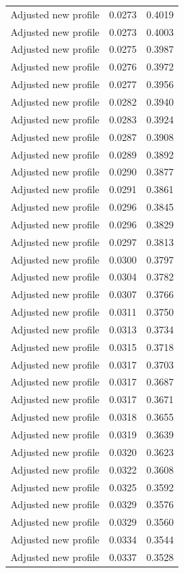 \begin{table}[htbp]
\begin{tabular}{lll}
Adjusted new profile & 0.0273 & 0.4019 \\
Adjusted new profile & 0.0273 & 0.4003 \\
Adjusted new profile & 0.0275 & 0.3987 \\
Adjusted new profile & 0.0276 & 0.3972 \\
Adjusted new profile & 0.0277 & 0.3956 \\
Adjusted new profile & 0.0282 & 0.3940 \\
Adjusted new profile & 0.0283 & 0.3924 \\
Adjusted new profile & 0.0287 & 0.3908 \\
Adjusted new profile & 0.0289 & 0.3892 \\
Adjusted new profile & 0.0290 & 0.3877 \\
Adjusted new profile & 0.0291 & 0.3861 \\
Adjusted new profile & 0.0296 & 0.3845 \\
Adjusted new profile & 0.0296 & 0.3829 \\
Adjusted new profile & 0.0297 & 0.3813 \\
Adjusted new profile & 0.0300 & 0.3797 \\
Adjusted new profile & 0.0304 & 0.3782 \\
Adjusted new profile & 0.0307 & 0.3766 \\
Adjusted new profile & 0.0311 & 0.3750 \\
Adjusted new profile & 0.0313 & 0.3734 \\
Adjusted new profile & 0.0315 & 0.3718 \\
Adjusted new profile & 0.0317 & 0.3703 \\
Adjusted new profile & 0.0317 & 0.3687 \\
Adjusted new profile & 0.0317 & 0.3671 \\
Adjusted new profile & 0.0318 & 0.3655 \\
Adjusted new profile & 0.0319 & 0.3639 \\
Adjusted new profile & 0.0320 & 0.3623 \\
Adjusted new profile & 0.0322 & 0.3608 \\
Adjusted new profile & 0.0325 & 0.3592 \\
Adjusted new profile & 0.0329 & 0.3576 \\
Adjusted new profile & 0.0329 & 0.3560 \\
Adjusted new profile & 0.0334 & 0.3544 \\
Adjusted new profile & 0.0337 & 0.3528 \\

\end{tabular}
\end{table}
